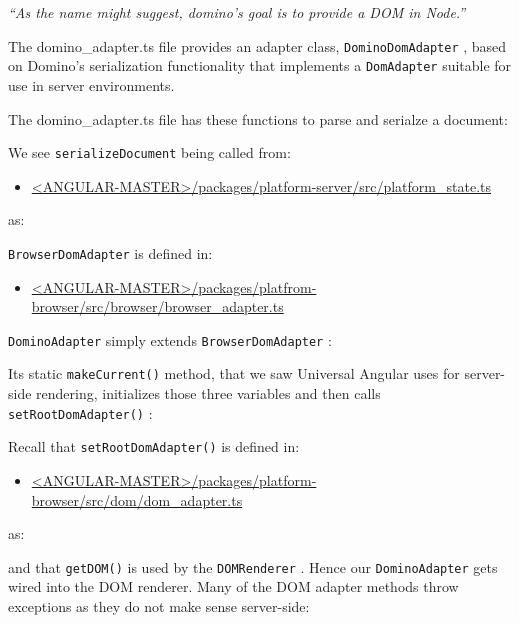 \emph{“As the name might suggest, domino's goal is to provide a DOM in Node.”}

The domino\_adapter.ts file provides an adapter class,
\texttt{DominoDomAdapter}
, based on
Domino’s serialization functionality that implements a
\texttt{DomAdapter}
suitable for use in
server environments.

The domino\_adapter.ts file has these functions to parse and serialze a document:



We see
\texttt{serializeDocument}
being called from:

\begin{itemize}
  \item \href{https://github.com/angular/angular/blob/master/packages/platform-server/src/platform_state.ts}
        {<ANGULAR-MASTER>/packages/platform-server/src/platform\_state.ts}
\end{itemize}

as:



\texttt{BrowserDomAdapter}
is defined in:

\begin{itemize}
  \item \href{https://github.com/angular/angular/blob/master/packages/platform-browser/src/browser/browser_adapter.ts}
        {<ANGULAR-MASTER>/packages/platfrom-browser/src/browser/browser\_adapter.ts}
\end{itemize}

\texttt{DominoAdapter}
simply extends
\texttt{BrowserDomAdapter}
:



Its static
\texttt{makeCurrent()}
method, that we saw Universal Angular uses for server-side
rendering,  initializes those three variables and then calls
\texttt{setRootDomAdapter()}
:



Recall that
\texttt{setRootDomAdapter()}
is defined in:

\begin{itemize}
  \item \href{https://github.com/angular/angular/blob/master/packages/platform-browser/src/dom/dom_adapter.ts}
        {<ANGULAR-MASTER>/packages/platform-browser/src/dom/dom\_adapter.ts}
\end{itemize}

as:



and that
\texttt{getDOM()}
is used by the
\texttt{DOMRenderer}
. Hence our
\texttt{DominoAdapter}
gets wired
into the DOM renderer.
Many of the  DOM adapter methods throw exceptions as they do not make sense
server-side:


